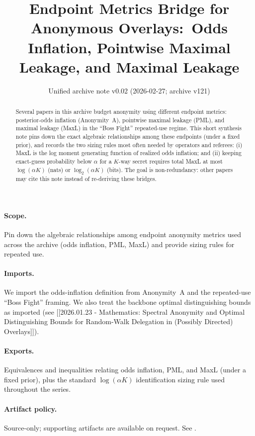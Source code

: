 \documentclass[11pt]{article}
\title{Endpoint Metrics Bridge for Anonymous Overlays:\ Odds Inflation, Pointwise Maximal Leakage, and Maximal Leakage}
\author{}
\date{Unified archive note v0.02 (2026-02-27; archive v121)}
\begin{document}
\maketitle

\begin{abstract}
Several papers in this archive budget anonymity using different endpoint metrics: posterior-odds inflation (Anonymity~A), pointwise maximal leakage (PML), and maximal leakage (MaxL) in the ``Boss Fight'' repeated-use regime.
This short synthesis note pins down the exact algebraic relationships among these endpoints (under a fixed prior), and records the two sizing rules most often needed by operators and referees:
(i) MaxL is the log moment generating function of realized odds inflation; and
(ii) keeping exact-guess probability below $\alpha$ for a $K$-way secret requires total MaxL at most $\log(\alpha K)$ (nats) or $\log_2(\alpha K)$ (bits).
The goal is non-redundancy: other papers may cite this note instead of re-deriving these bridges.
\end{abstract}

\paragraph{Scope.}
Pin down the algebraic relationships among endpoint anonymity metrics used across the archive (odds inflation, PML, MaxL) and provide sizing rules for repeated use.

\paragraph{Imports.}
We import the odds-inflation definition from Anonymity~A and the repeated-use ``Boss Fight'' framing.\cite{series:oddsinflation,series:bossfightA}
We also treat the backbone optimal distinguishing bounds as imported (see [[2026.01.23 - Mathematics: Spectral Anonymity and Optimal Distinguishing Bounds for Random-Walk Delegation in (Possibly Directed) Overlays]]).


\paragraph{Exports.}
Equivalences and inequalities relating odds inflation, PML, and MaxL (under a fixed prior), plus the standard $\log(\alpha K)$ identification sizing rule used throughout the series.

\paragraph{Artifact policy.}
Source-only; supporting artifacts are available on request. See \cite{series:artifactpolicy}.
\end{document}
